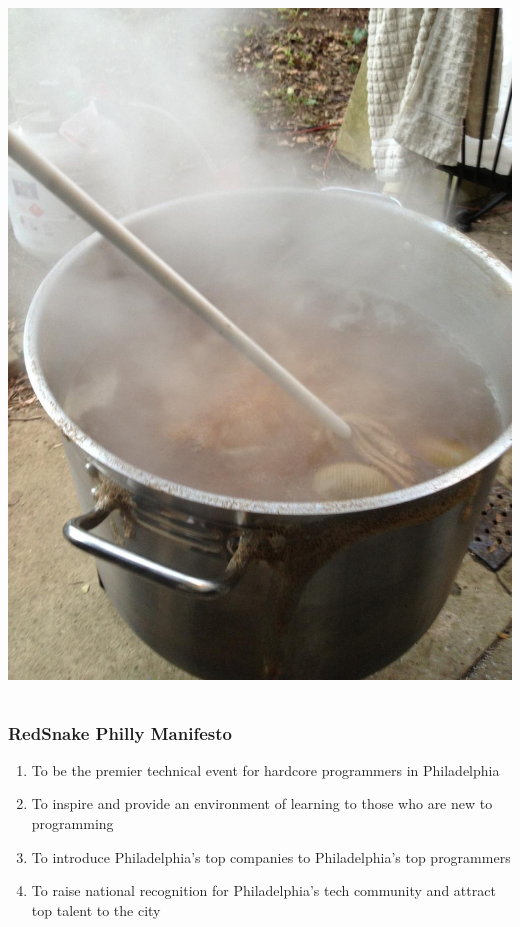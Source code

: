\documentclass[xcolor=dvipsnames,red]{beamer}
\begin{document}
\begin{frame}
\begin{columns}
\begin{column}{.5\textwidth}
\includegraphics[width=1\textwidth]{imgs/brew.JPG}
\end{column}
\end{columns}
\end{frame}

\begin{frame}
\frametitle{RedSnake Philly Manifesto}
\begin{enumerate}
\item To be the premier technical event for hardcore programmers in Philadelphia
\item To inspire and provide an environment of learning to those who are new to programming
\item To introduce Philadelphia's top companies to Philadelphia's top programmers
\item To raise national recognition for Philadelphia's tech community and
  attract top talent to the city
\end{enumerate}
\end{frame}
\end{document}
